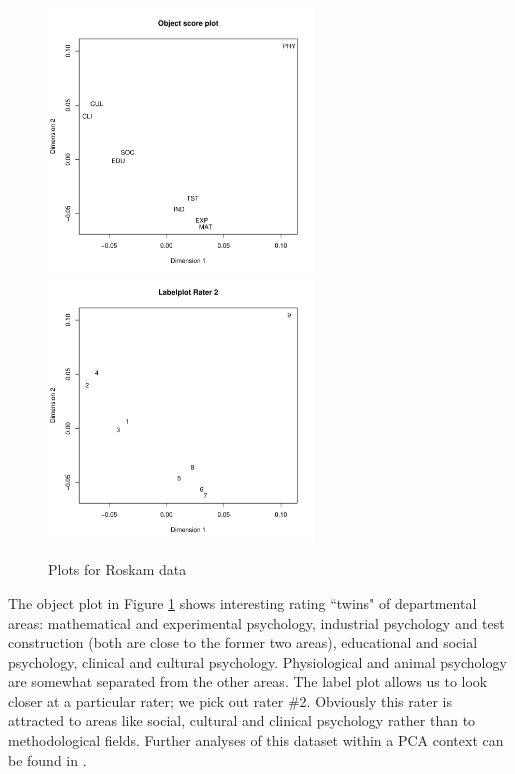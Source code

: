 \documentclass[article]{Z}
\begin{document}
\begin{figure}[hbt]
\begin{center}
\includegraphics[height=70mm, width=70mm]{roskamobj.pdf}
\includegraphics[height=70mm, width=70mm]{roskamlab.pdf}
\caption{\label{fig:roskam}Plots for Roskam data}
\end{center}
\end{figure}

The object plot in Figure \ref{fig:roskam} shows interesting rating ``twins" of departmental areas: mathematical and experimental psychology, industrial psychology and test construction (both are close to the former two areas), educational and social psychology, clinical and cultural psychology. Physiological and animal psychology are somewhat separated from the other areas. The label plot allows us to look closer at a particular rater; we pick out rater \#2. 
Obviously this rater is attracted to areas like social, cultural and clinical psychology rather than to methodological fields. Further analyses of this dataset within a PCA context can be found in \citet{deLeeuw:06}.
\end{document}
